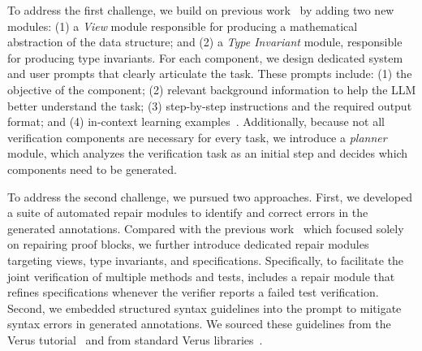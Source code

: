To address the first challenge, we build on previous work~\cite{autoverus} by adding two new modules: (1) a \emph{View} module responsible for producing a mathematical abstraction of the data structure; and (2) a \emph{Type Invariant} module, responsible for producing type invariants.  For each component, we design dedicated system and user prompts that clearly articulate the task. These prompts include: (1) the objective of the component; (2) relevant background information to help the LLM better understand the task; (3) step-by-step instructions and the required output format; and (4) in-context learning examples~\cite{incontextlearning}.
Additionally, because not all verification components are necessary for every task, we introduce a \emph{planner} module, which analyzes the verification task as an initial step and decides which components need to be generated.

To address the second challenge, we pursued two approaches. First, we developed a suite of automated repair modules to identify and correct errors in the generated annotations. Compared with the previous work~\cite{autoverus} which focused solely on repairing proof blocks, we further introduce dedicated repair modules targeting views, type invariants, and specifications. Specifically, to facilitate the joint verification of multiple methods and tests, \toolname{} includes a repair module that refines specifications whenever the verifier reports a failed test verification. Second, we embedded structured syntax guidelines into the prompt to mitigate syntax errors in generated annotations. We sourced these guidelines from the Verus tutorial~\cite{verus-tutorial} and from standard Verus libraries~\cite{verus-stdlib}.



